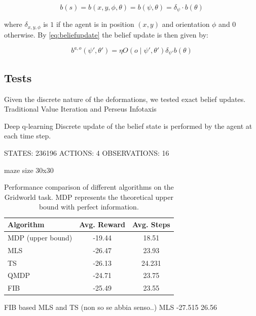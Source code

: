 $$b(s) = b(x,y,\phi,\theta) = b(\psi, \theta) = \delta_{\psi} \cdot b(\theta)$$

where $\delta_{x,y,\phi}$ is $1$ if the agent is in position $(x,y)$ and orientation $\phi$ and $0$ otherwise.
By \cref{eq:beliefupdate} the belief update is then given by:

\begin{equation}
    \label{eq:beliefupdategridworld}
    b^{a,o}(\psi',\theta') = \eta O(o\mid \psi',\theta') \delta_{\psi'}b(\theta) 
\end{equation}



\subsection{Tests}

Given the discrete nature of the deformations, we tested exact belief updates.
Traditional Value Iteration and Perseus Infotaxis

Deep q-learning 
Discrete update of the belief state is performed by the agent at each time step.


STATES: 236196
ACTIONS: 4
OBSERVATIONS: 16

maze size 30x30

\begin{table}[h]
\centering
\begin{tabular}{lcc}
\toprule
\textbf{Algorithm} & \textbf{Avg. Reward} & \textbf{Avg. Steps} \\
\midrule
MDP (upper bound) & -19.44 & 18.51\\
MLS & -26.47 & 23.93\\
TS &-26.13 & 24.231\\
QMDP & -24.71 & 23.75 \\
FIB & -25.49 & 23.55 \\
\bottomrule
\end{tabular}
\caption{Performance comparison of different algorithms on the Gridworld task. MDP represents the theoretical upper bound with perfect information.}
\label{tab:gridworld_results}
\end{table}

FIB based MLS and TS (non so se abbia senso..)
MLS
-27.515 26.56

